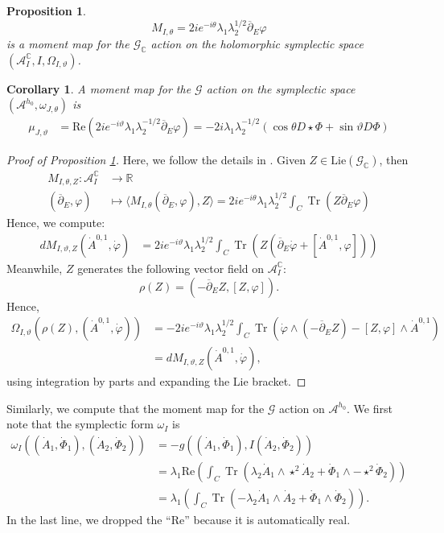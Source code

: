 \documentclass[12pt,letterpaper,reqno]{amsart}
\newtheorem{cor}[thm]{Corollary}
\newtheorem{prop}[thm]{Proposition}
\theoremstyle{remark}
\theoremstyle{definition}
\numberwithin{thm}{section}
\numberwithin{equation}{section}
\numberwithin{figure}{section}
\newcommand{\C}{\ensuremath{\mathbb C}}
\newcommand{\delbar}{\ensuremath{\overline{\partial}}}
\DeclareMathOperator{\Tr}{Tr}
\begin{document}
\begin{prop}\label{prop:M}
 \[M_{I, \theta} = 2i e^{-i \theta}\lambda_1 \lambda_2^{1/2}  \delbar_E \varphi \]
 is a moment map for the $\mathcal{G}_{\C}$ action on the holomorphic symplectic space $(\mathcal{A}_I^{\C}, I, \Omega_{I, \vartheta})$.
\end{prop}
\begin{cor}
A moment map for the $\mathcal{G}$ action on the symplectic space $(\mathcal{A}^{h_0}, \omega_{J, \theta})$ is 
\begin{align*} 
\mu_{J, \vartheta} &= \mathrm{Re} (2i e^{-i \vartheta} \lambda_1 \lambda_2^{-1/2} \delbar_E \varphi) = -2i \lambda_1 \lambda_2^{-1/2} ( \cos \theta D  \star \Phi + \sin \vartheta D \Phi)
\end{align*}
\end{cor}
\begin{proof}[Proof of Proposition \ref{prop:M}]
Here, we follow the details in \cite{Neitzkecourse}. Given $Z \in \mathrm{Lie}(\mathcal{G}_{\C})$, then 
\begin{align*} 
M_{I, \theta, Z}: \mathcal{A}_I^{\C} & \to \mathbb{R}\\
(\delbar_E, \varphi) &\mapsto \langle M_{I, \theta}(\delbar_E, \varphi), Z \rangle  =2i e^{-i \theta}\lambda_1 \lambda_2^{1/2}  \int_C \Tr(Z  \delbar_E \varphi) \end{align*}
Hence, we compute: 
\begin{align*}
d M_{I, \vartheta, Z}(\dot{A}^{0,1}, \dot{\varphi}) &= 2i e^{-i \vartheta}\lambda_1 \lambda_2^{1/2}  \int_C \Tr(Z ( \delbar_E \dot \varphi + [\dot{A}^{0,1}, \varphi]))
\end{align*}
Meanwhile, $Z$ generates the following vector field on $\mathcal{A}_I^{\C}$:
\[ \rho(Z) = (-\delbar_E Z, [Z, \varphi]).\]
Hence, 
\begin{align*}
\Omega_{I, \vartheta}(\rho(Z), (\dot{A}^{0,1}, \dot{\varphi}))
&=-2i e^{-i \vartheta}   \lambda_1 \lambda_2^{1/2} \int_C  \Tr  \left(\dot \varphi \wedge (-\delbar_E Z) -[Z, \varphi] \wedge \dot{A}^{0,1}  \right) \\
&=d M_{I, \vartheta, Z}(\dot{A}^{0,1}, \dot{\varphi}),
\end{align*}
using integration by parts and expanding the Lie bracket. 
\end{proof}


Similarly, we compute that the moment map for the $\mathcal{G}$ action on $\mathcal{A}^{h_0}$. We first note that the symplectic form $\omega_I$ is 
\begin{align*}
\omega_I((\dot{A}_1, \dot \Phi_1), (\dot{A}_2, \dot \Phi_2))&= -g \left((\dot{A}_1, \dot \Phi_1), I(\dot{A}_2, \dot{\Phi}_2)\right)\\
&=  \lambda_1 \mathrm{Re} \left(\int_C \Tr \left( \lambda_2 \dot{A}_1 \wedge \star^2\dot{A}_2 + \dot \Phi_1 \wedge -\star^2  \dot\Phi_2 \right) \right)\\
&= \lambda_1  \left(\int_C \Tr \left(-\lambda_2 \dot{A}_1 \wedge \dot{A}_2 +\dot \Phi_1 \wedge  \dot\Phi_2 \right) \right).
\end{align*}
In the last line, we dropped the ``$\mathrm{Re}$'' because it is automatically real.
\end{document}

